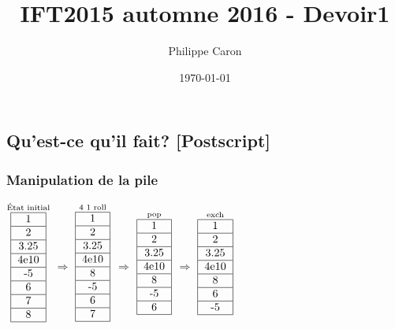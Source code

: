 \documentclass{article}
\title{IFT2015 automne 2016 - Devoir1} %
\author{Philippe Caron}
\date{\today}
\begin{document}
\maketitle

\subsection{Qu'est-ce qu'il fait? [Postscript]}
\subsubsection{Manipulation de la pile}
$\stackrel{\text{État initial}}{
  \begin{tabular}{|c|}
    \hline 1 \\
    \hline 2 \\
    \hline 3.25 \\
    \hline 4e10 \\
    \hline -5 \\
    \hline 6 \\
    \hline 7 \\
    \hline 8 \\
    \hline
\end{tabular}}$
$\Rightarrow$
$\stackrel{\text{4 1 roll}}{
  \begin{tabular}{|c|}
    \hline 1 \\
    \hline 2 \\
    \hline 3.25 \\
    \hline 4e10 \\
    \hline 8 \\
    \hline -5 \\
    \hline 6 \\
    \hline 7 \\
    \hline
\end{tabular}}$
$\Rightarrow$
$\stackrel{\text{pop}}{
  \begin{tabular}{|c|}
    \hline 1 \\
    \hline 2 \\
    \hline 3.25 \\
    \hline 4e10 \\
    \hline 8 \\
    \hline -5 \\
    \hline 6 \\
    \hline
\end{tabular}}$
$\Rightarrow$
$\stackrel{\text{exch}}{
  \begin{tabular}{|c|}
    \hline 1 \\
    \hline 2 \\
    \hline 3.25 \\
    \hline 4e10 \\
    \hline 8 \\
    \hline 6 \\
    \hline -5 \\
    \hline
\end{tabular}}$
\end{document}
